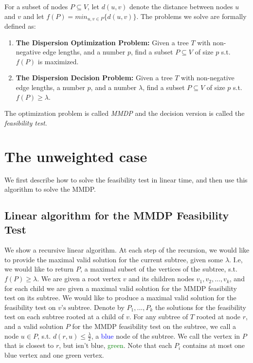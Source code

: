 \documentclass[11pt,a4paper]{article}
\newtheorem{algo}{Algorithm}[section]
\theoremstyle{definition}
\newtheorem{definition}{Definition}
\theoremstyle{remark}
\begin{document}
For a subset of nodes $P\subseteq V$, let $d(u,v)$ denote the distance between nodes $u$ and $v$ and let $f(P)=min_{u,v\in P} \{d(u,v)\}$. The problems we solve are formally defined as: 

\begin{enumerate}
\item {\bf The Dispersion Optimization Problem:} Given a tree $T$ with non-negative edge lengths, and a  number $p$, find a subset $P\subseteq V$ of size $p$ s.t.  $f(P)$ is maximized. 

\item {\bf The Dispersion Decision Problem:}  Given a tree $T$ with non-negative edge lengths, a number $p$, and a number $\lambda$, find a subset $P\subseteq V$ of size $p$ s.t. $f(P)\geq\lambda$.
\end{enumerate}

\noindent The optimization problem is called {\em MMDP} and the decision version is called the {\em feasibility test}.
%
%
\section{The unweighted case}
We first describe how to solve the feasibility test in linear time, and then use this algorithm to solve the MMDP.
\subsection{Linear algorithm for the MMDP Feasibility Test}
We show a recursive linear algorithm.
At each step of the recursion, we would like to provide the maximal valid solution for the current subtree, given some $\lambda$. I.e, we would like to return $P$, a maximal subset of the vertices of the subtree, s.t. $f(P)\geq\lambda$.
We are given a root vertex $v$ and its children nodes $v_{1},v_{2},...,v_{k}$, and for each child we are given a maximal valid solution for the MMDP feasibility test on its subtree. We would like to produce a maximal valid solution for the feasibility test on $v\text{'s subtree}$.
Denote by $P_{1},...,P_{k}$ the solutions for the feasibility test on each subtree rooted at a child of $v$.
For any subtree of $T$ rooted at node $r$, and a valid solution $P$ for the MMDP feasibility test on the subtree, we call a node $u\in P$, s.t. $d(r,u)\leq\frac{\lambda}{2}$, a \textcolor{blue}{blue} node of the subtree. We call the vertex in $P$ that is closest to $r$, but isn't blue, \textcolor{green}{green}.
Note that each $P_{i}$ contains at most one blue vertex and one green vertex.
\end{document}
